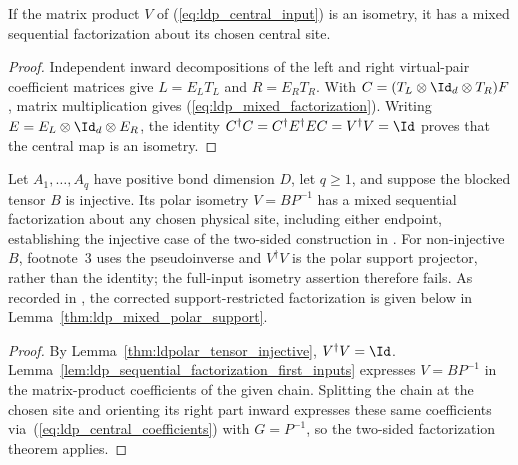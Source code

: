 \begin{lemma}
    \label{thm:ldp_mixed_sequential_general}
    \leanok
    If the matrix product $V$ of (\ref{eq:ldp_central_input}) is an isometry,
    it has a mixed sequential factorization about its chosen central site.
\end{lemma}
\begin{proof}
    \leanok
    Independent inward decompositions of the left and right virtual-pair
    coefficient matrices give $L=E_L T_L$ and $R=E_R T_R$.
    With $C=(T_L\otimes\Id_d\otimes T_R)F$,
    matrix multiplication gives (\ref{eq:ldp_mixed_factorization}).
    Writing $E=E_L\otimes\Id_d\otimes E_R$, the identity
    $C^\dagger C=C^\dagger E^\dagger EC=V^\dagger V=\Id$
    proves that the central map is an isometry.
\end{proof}

\begin{lemma}
    \label{thm:ldp_mixed_sequential_polar}
    \leanok
    Let $A_1,\ldots,A_q$ have positive bond dimension $D$, let $q\ge1$,
    and suppose the blocked tensor $B$ is injective. Its polar isometry
    $V=BP^{-1}$ has a mixed sequential factorization about any chosen
    physical site, including either endpoint, establishing the injective case
    of the two-sided construction in
    \cite[footnote~4 to eqs.~(13)--(15)]{Malz2024Preparation}.
    For non-injective $B$, footnote~3 uses the pseudoinverse and
    $V^\dagger V$ is the polar support projector, rather than the identity;
    the full-input isometry assertion therefore fails. As recorded in
    \cite{gap:mswc24_mixed_polar_injectivity_scope}, the corrected
    support-restricted factorization is given below in
    Lemma~\ref{thm:ldp_mixed_polar_support}.
\end{lemma}
\begin{proof}
    \leanok
    By Lemma~\ref{thm:ldpolar_tensor_injective}, $V^\dagger V=\Id$.
    Lemma~\ref{lem:ldp_sequential_factorization_first_inputs} expresses
    $V=BP^{-1}$ in the matrix-product coefficients of the given chain.
    Splitting the chain at the chosen site and orienting its right part inward
    expresses these same coefficients via~(\ref{eq:ldp_central_coefficients})
    with $G=P^{-1}$, so the two-sided factorization theorem applies.
\end{proof}
